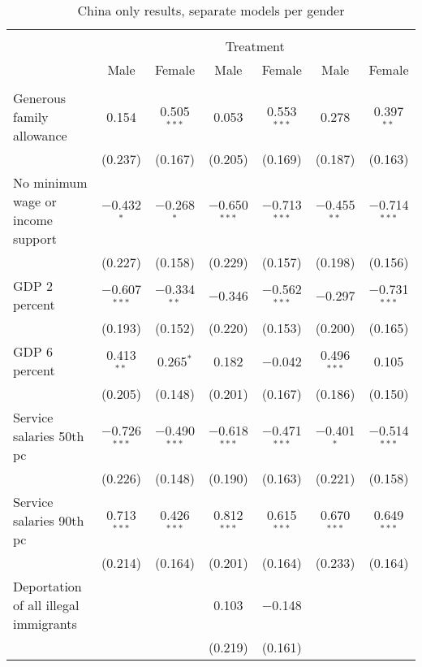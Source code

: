 
\begin{sidewaystable}[!htbp] \centering 
  \caption{China only results, separate models per gender} 
  \label{tab:china_gender} 
\begin{tabular}{@{\extracolsep{5pt}}lcccccc} 
\\[-1.8ex]\hline 
\hline \\[-1.8ex] 
 & \multicolumn{6}{c}{Treatment} \\ 
\cline{2-7} 
 & Male & Female & Male & Female & Male & Female \\ 
\hline \\[-1.8ex] 
 Generous family allowance & 0.154 & 0.505$^{***}$ & 0.053 & 0.553$^{***}$ & 0.278 & 0.397$^{**}$ \\ 
  & (0.237) & (0.167) & (0.205) & (0.169) & (0.187) & (0.163) \\ 
  No minimum wage or income support & $-$0.432$^{*}$ & $-$0.268$^{*}$ & $-$0.650$^{***}$ & $-$0.713$^{***}$ & $-$0.455$^{**}$ & $-$0.714$^{***}$ \\ 
  & (0.227) & (0.158) & (0.229) & (0.157) & (0.198) & (0.156) \\ 
  GDP 2 percent & $-$0.607$^{***}$ & $-$0.334$^{**}$ & $-$0.346 & $-$0.562$^{***}$ & $-$0.297 & $-$0.731$^{***}$ \\ 
  & (0.193) & (0.152) & (0.220) & (0.153) & (0.200) & (0.165) \\ 
  GDP 6 percent & 0.413$^{**}$ & 0.265$^{*}$ & 0.182 & $-$0.042 & 0.496$^{***}$ & 0.105 \\ 
  & (0.205) & (0.148) & (0.201) & (0.167) & (0.186) & (0.150) \\ 
  Service salaries 50th pc & $-$0.726$^{***}$ & $-$0.490$^{***}$ & $-$0.618$^{***}$ & $-$0.471$^{***}$ & $-$0.401$^{*}$ & $-$0.514$^{***}$ \\ 
  & (0.226) & (0.148) & (0.190) & (0.163) & (0.221) & (0.158) \\ 
  Service salaries 90th pc & 0.713$^{***}$ & 0.426$^{***}$ & 0.812$^{***}$ & 0.615$^{***}$ & 0.670$^{***}$ & 0.649$^{***}$ \\ 
  & (0.214) & (0.164) & (0.201) & (0.164) & (0.233) & (0.164) \\ 
  Deportation of all illegal immigrants &  &  & 0.103 & $-$0.148 &  &  \\ 
  &  &  & (0.219) & (0.161) &  &  \\ 

\end{tabular}
\end{sidewaystable}

